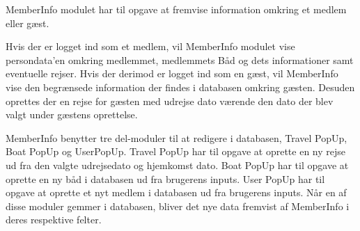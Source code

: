 MemberInfo modulet har til opgave at fremvise information omkring et medlem eller gæst.

Hvis der er logget ind som et medlem, vil MemberInfo modulet vise persondata’en omkring medlemmet, medlemmets Båd og dets informationer samt eventuelle rejser. Hvis der derimod er logget ind som en gæst, vil MemberInfo vise den begrænsede information der findes i databasen omkring gæsten. Desuden oprettes der en rejse for gæsten med udrejse dato værende den dato der blev valgt under gæstens oprettelse. 

MemberInfo benytter tre del-moduler til at redigere i databasen, Travel PopUp, Boat PopUp og UserPopUp. Travel PopUp har til opgave at oprette en ny rejse ud fra den valgte udrejsedato og hjemkomst dato. Boat PopUp har til opgave at oprette en ny båd i databasen ud fra brugerens inputs. User PopUp har til opgave at oprette et nyt medlem i databasen ud fra brugerens inputs. Når en af disse moduler gemmer i databasen, bliver det nye data fremvist af MemberInfo i deres respektive felter.
